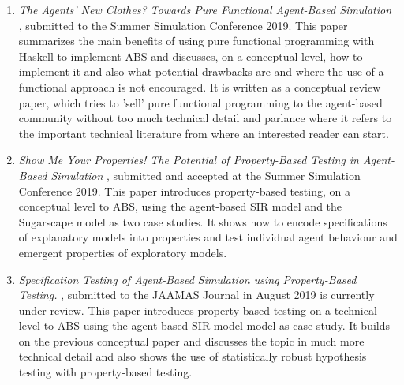\begin{enumerate}
	\item \textit{The Agents' New Clothes? Towards Pure Functional Agent-Based Simulation} \cite{thaler_agents_2019}, submitted to the Summer Simulation Conference 2019. This paper summarizes the main benefits of using pure functional programming with Haskell to implement ABS and discusses, on a conceptual level, how to implement it and also what potential drawbacks are and where the use of a functional approach is not encouraged. It is written as a conceptual review paper, which tries to 'sell' pure functional programming to the agent-based community without too much technical detail and parlance where it refers to the important technical literature from where an interested reader can start.
	
	\item \textit{Show Me Your Properties! The Potential of Property-Based Testing in Agent-Based Simulation} \cite{thaler_show_2019}, submitted and accepted at the Summer Simulation Conference 2019. This paper introduces property-based testing, on a conceptual level to ABS, using the agent-based SIR model and the Sugarscape model as two case studies. It shows how to encode specifications of explanatory models into properties and test individual agent behaviour and emergent properties of exploratory models.
	
	\item \textit{Specification Testing of Agent-Based Simulation using Property-Based Testing.} \cite{thaler_specification_2019}, submitted to the JAAMAS Journal in August 2019 is currently under review.
This paper introduces property-based testing on a technical level to ABS using the agent-based SIR model model as case study. It builds on the previous conceptual paper and discusses the topic in much more technical detail and also shows the use of statistically robust hypothesis testing with property-based testing.
\end{enumerate}